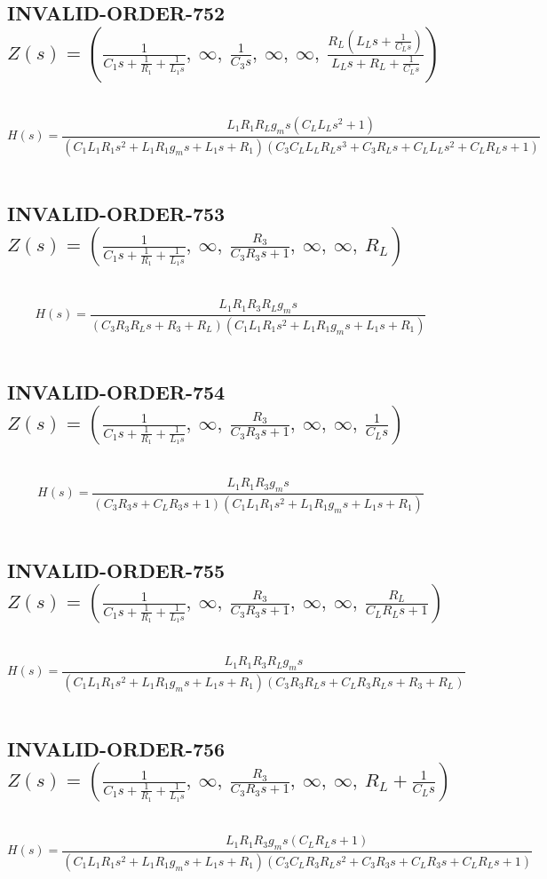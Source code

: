 \documentclass{article}
\begin{document}
\subsection{INVALID-ORDER-752 $Z(s) = \left( \frac{1}{C_{1} s + \frac{1}{R_{1}} + \frac{1}{L_{1} s}}, \  \infty, \  \frac{1}{C_{3} s}, \  \infty, \  \infty, \  \frac{R_{L} \left(L_{L} s + \frac{1}{C_{L} s}\right)}{L_{L} s + R_{L} + \frac{1}{C_{L} s}}\right)$ } \ 
\textbf{\[H(s) = \frac{L_{1} R_{1} R_{L} g_{m} s \left(C_{L} L_{L} s^{2} + 1\right)}{\left(C_{1} L_{1} R_{1} s^{2} + L_{1} R_{1} g_{m} s + L_{1} s + R_{1}\right) \left(C_{3} C_{L} L_{L} R_{L} s^{3} + C_{3} R_{L} s + C_{L} L_{L} s^{2} + C_{L} R_{L} s + 1\right)}\] } \ 
\subsection{INVALID-ORDER-753 $Z(s) = \left( \frac{1}{C_{1} s + \frac{1}{R_{1}} + \frac{1}{L_{1} s}}, \  \infty, \  \frac{R_{3}}{C_{3} R_{3} s + 1}, \  \infty, \  \infty, \  R_{L}\right)$ } \ 
\textbf{\[H(s) = \frac{L_{1} R_{1} R_{3} R_{L} g_{m} s}{\left(C_{3} R_{3} R_{L} s + R_{3} + R_{L}\right) \left(C_{1} L_{1} R_{1} s^{2} + L_{1} R_{1} g_{m} s + L_{1} s + R_{1}\right)}\] } \ 
\subsection{INVALID-ORDER-754 $Z(s) = \left( \frac{1}{C_{1} s + \frac{1}{R_{1}} + \frac{1}{L_{1} s}}, \  \infty, \  \frac{R_{3}}{C_{3} R_{3} s + 1}, \  \infty, \  \infty, \  \frac{1}{C_{L} s}\right)$ } \ 
\textbf{\[H(s) = \frac{L_{1} R_{1} R_{3} g_{m} s}{\left(C_{3} R_{3} s + C_{L} R_{3} s + 1\right) \left(C_{1} L_{1} R_{1} s^{2} + L_{1} R_{1} g_{m} s + L_{1} s + R_{1}\right)}\] } \ 
\subsection{INVALID-ORDER-755 $Z(s) = \left( \frac{1}{C_{1} s + \frac{1}{R_{1}} + \frac{1}{L_{1} s}}, \  \infty, \  \frac{R_{3}}{C_{3} R_{3} s + 1}, \  \infty, \  \infty, \  \frac{R_{L}}{C_{L} R_{L} s + 1}\right)$ } \ 
\textbf{\[H(s) = \frac{L_{1} R_{1} R_{3} R_{L} g_{m} s}{\left(C_{1} L_{1} R_{1} s^{2} + L_{1} R_{1} g_{m} s + L_{1} s + R_{1}\right) \left(C_{3} R_{3} R_{L} s + C_{L} R_{3} R_{L} s + R_{3} + R_{L}\right)}\] } \ 
\subsection{INVALID-ORDER-756 $Z(s) = \left( \frac{1}{C_{1} s + \frac{1}{R_{1}} + \frac{1}{L_{1} s}}, \  \infty, \  \frac{R_{3}}{C_{3} R_{3} s + 1}, \  \infty, \  \infty, \  R_{L} + \frac{1}{C_{L} s}\right)$ } \ 
\textbf{\[H(s) = \frac{L_{1} R_{1} R_{3} g_{m} s \left(C_{L} R_{L} s + 1\right)}{\left(C_{1} L_{1} R_{1} s^{2} + L_{1} R_{1} g_{m} s + L_{1} s + R_{1}\right) \left(C_{3} C_{L} R_{3} R_{L} s^{2} + C_{3} R_{3} s + C_{L} R_{3} s + C_{L} R_{L} s + 1\right)}\] } \ 
\end{document}
